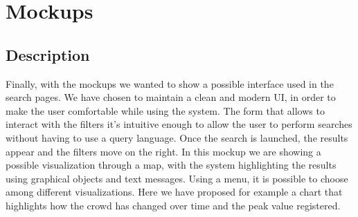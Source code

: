 \documentclass[../main.tex]{subfiles}
\begin{document}
    \chapter{Mockups}\label{ch:mockups}
    \section{Description}\label{sec:description3}
    Finally, with the mockups we wanted to show a possible interface used in the search pages. We have chosen to maintain a clean and modern UI, in order to make the user comfortable while using the system. The form that allows to interact with the filters it's intuitive enough to allow the user to perform searches without having to use a query language.
    Once the search is launched, the results appear and the filters move on the right. 
    In this mockup we are showing a possible visualization through a map, with the system highlighting the results using graphical objects and text messages.
    Using a menu, it is possible to choose among different visualizations. Here we have proposed for example a chart that highlights how the crowd has changed over time and the peak value registered.
\end{document}
